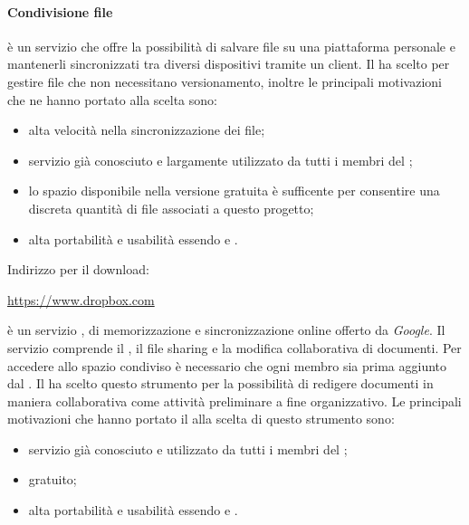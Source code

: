             \paragraph{Condivisione file}
            \textit{} è un servizio che offre la possibilità di salvare file su una piattaforma  personale e mantenerli sincronizzati tra diversi dispositivi tramite un client.
            Il  ha scelto  per gestire file che non necessitano versionamento,
            inoltre le principali motivazioni che ne hanno portato alla scelta sono:
            \begin{itemize}
            	\item alta velocità nella sincronizzazione dei file;
            	\item servizio già conosciuto e largamente utilizzato da tutti i membri del ;
            	\item lo spazio disponibile nella versione gratuita è sufficente per consentire una discreta quantità di file associati a questo progetto;
            	\item alta portabilità e usabilità essendo  e .
            \end{itemize}
            Indirizzo per il download:
            \begin{center}
            	\url{https://www.dropbox.com}
            \end{center}
            \textit{} è un servizio , di memorizzazione e sincronizzazione online offerto da \textit{Google}. Il servizio comprende il , il file sharing e la modifica collaborativa di documenti. Per accedere allo spazio condiviso è necessario che ogni membro sia prima aggiunto dal \responsabilediprogetto.
            Il  ha scelto questo strumento per la possibilità di redigere documenti in maniera collaborativa come attività preliminare a fine organizzativo.
            Le principali motivazioni che hanno portato il  alla scelta di questo strumento sono:
            \begin{itemize}
            	\item servizio già conosciuto e utilizzato da tutti i membri del ;
            	\item gratuito;
            	\item alta portabilità e usabilità essendo  e .
            \end{itemize}
